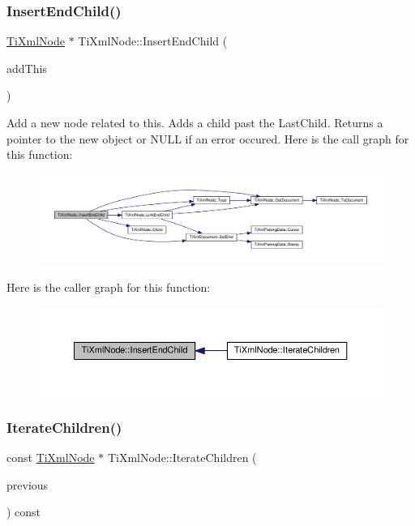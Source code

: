 \subsubsection{\texorpdfstring{Insert\+End\+Child()}{InsertEndChild()}}
{\footnotesize\ttfamily \hyperlink{class_ti_xml_node}{Ti\+Xml\+Node} $\ast$ Ti\+Xml\+Node\+::\+Insert\+End\+Child (\begin{DoxyParamCaption}\item[{const \hyperlink{class_ti_xml_node}{Ti\+Xml\+Node} \&}]{add\+This }\end{DoxyParamCaption})}

Add a new node related to this. Adds a child past the Last\+Child. Returns a pointer to the new object or N\+U\+LL if an error occured. Here is the call graph for this function\+:\nopagebreak
\begin{figure}[H]
\begin{center}
\leavevmode
\includegraphics[width=350pt]{class_ti_xml_node_af287a913ce46d8dbf7ef24fec69bbaf0_cgraph}
\end{center}
\end{figure}
Here is the caller graph for this function\+:\nopagebreak
\begin{figure}[H]
\begin{center}
\leavevmode
\includegraphics[width=350pt]{class_ti_xml_node_af287a913ce46d8dbf7ef24fec69bbaf0_icgraph}
\end{center}
\end{figure}
\mbox{\label{class_ti_xml_node_a67c3a02b797f08d9a31b2553661257e1}} 
\subsubsection{\texorpdfstring{Iterate\+Children()}{IterateChildren()}\hspace{0.1cm}{\footnotesize\ttfamily [1/4]}}
{\footnotesize\ttfamily const \hyperlink{class_ti_xml_node}{Ti\+Xml\+Node} $\ast$ Ti\+Xml\+Node\+::\+Iterate\+Children (\begin{DoxyParamCaption}\item[{const \hyperlink{class_ti_xml_node}{Ti\+Xml\+Node} $\ast$}]{previous }\end{DoxyParamCaption}) const}

